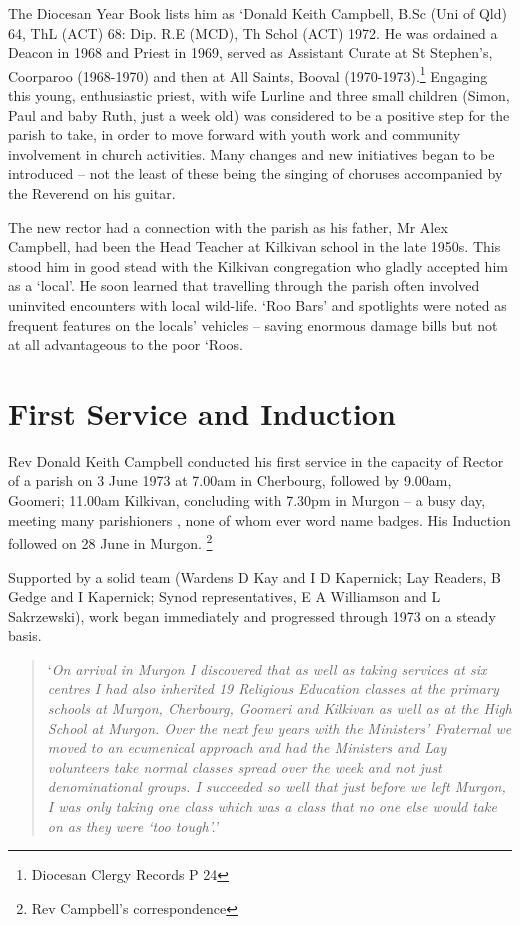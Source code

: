 The Diocesan Year Book lists him as `Donald Keith Campbell, B.Sc (Uni of
Qld) 64, ThL (ACT) 68: Dip. R.E (MCD), Th Schol (ACT) 1972. He was
ordained a Deacon in 1968 and Priest in 1969, served as Assistant Curate
at St Stephen's, Coorparoo (1968-1970) and then at All Saints, Booval
(1970-1973).\footnote{Diocesan Clergy Records P 24} Engaging this young,
enthusiastic priest, with wife Lurline and three small children (Simon,
Paul and baby Ruth, just a week old) was considered to be a positive
step for the parish to take, in order to move forward with youth work
and community involvement in church activities. Many changes and new
initiatives began to be introduced -- not the least of these being the
singing of choruses accompanied by the Reverend on his guitar.

The new rector had a connection with the parish as his father, Mr Alex
Campbell, had been the Head Teacher at Kilkivan school in the late
1950s. This stood him in good stead with the Kilkivan congregation who
gladly accepted him as a `local'. He soon learned that travelling
through the parish often involved uninvited encounters with local
wild-life. `Roo Bars' and spotlights were noted as frequent features on
the locals' vehicles -- saving enormous damage bills but not at all
advantageous to the poor `Roos.

\hypertarget{first-service-and-induction}{%
\section{First Service and
Induction}\label{first-service-and-induction}}

Rev Donald Keith Campbell conducted his first service in the capacity of
Rector of a parish on 3 June 1973 at 7.00am in Cherbourg, followed by
9.00am, Goomeri; 11.00am Kilkivan, concluding with 7.30pm in Murgon -- a
busy day, meeting many parishioners , none of whom ever word name
badges. His Induction followed on 28 June in Murgon. \footnote{Rev
  Campbell's correspondence}

Supported by a solid team (Wardens D Kay and I D Kapernick; Lay Readers,
B Gedge and I Kapernick; Synod representatives, E A Williamson and L
Sakrzewski), work began immediately and progressed through 1973 on a
steady basis.

\begin{quote}
`\emph{On arrival in Murgon I discovered that as well as taking services
at six centres I had also inherited 19 Religious Education classes at
the primary schools at Murgon, Cherbourg, Goomeri and Kilkivan as well
as at the High School at Murgon. Over the next few years with the
Ministers' Fraternal we moved to an ecumenical approach and had the
Ministers and Lay volunteers take normal classes spread over the week
and not just denominational groups. I succeeded so well that just before
we left Murgon, I was only taking one class which was a class that no
one else would take on as they were `too tough'.'}
\end{quote}

